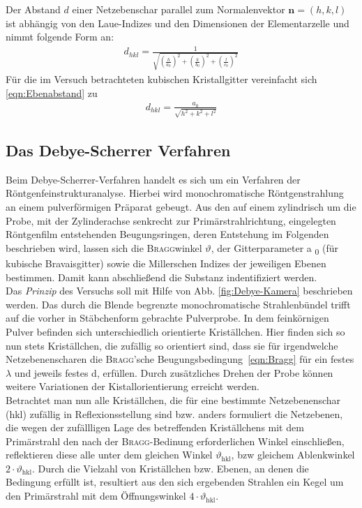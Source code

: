 \documentclass[a4paper,twoside,final]{article}
\begin{document}
Der Abstand $d$ einer Netzebenschar parallel zum Normalenvektor $\bm{n}=(h,k,l)$ ist abhängig von den Laue-Indizes und den Dimensionen der Elementarzelle und nimmt folgende Form an:
\begin{align}
  d_{hkl} = \frac{1}{\sqrt{\left(\frac{h}{a_0}\right)^2+\left(\frac{k}{b_0}\right)^2+\left(\frac{l}{c_0}\right)^2}}\label{eqn:Ebenabstand}
\end{align}
Für die im Versuch betrachteten kubischen Kristallgitter vereinfacht sich \eqref{eqn:Ebenabstand} zu
\begin{align}
  d_{hkl} = \frac{a_0}{\sqrt{h^2+k^2+l^2}}\label{eqn:Abstand_kubisch}
\end{align}

\subsection{Das Debye-Scherrer Verfahren}
Beim Debye-Scherrer-Verfahren handelt es sich um ein Verfahren der Röntgenfeinstrukturanalyse. Hierbei wird monochromatische Röntgenstrahlung an einem pulverförmigen Präparat gebeugt. Aus den auf einem zylindrisch um die Probe, mit der Zylinderachse senkrecht zur Primärstrahlrichtung, eingelegten Röntgenfilm entstehenden Beugungsringen, deren Entstehung im Folgenden beschrieben wird, lassen sich die \textsc{Bragg}winkel $\vartheta$, der Gitterparameter a \textsubscript{0} (für kubische Bravaisgitter) sowie die Millerschen Indizes der jeweiligen Ebenen bestimmen. Damit kann abschließend die Substanz indentifiziert werden.\\
Das \textit{Prinzip} des Versuchs soll mit Hilfe von Abb. \ref{fig:Debye-Kamera} beschrieben werden. Das durch die Blende begrenzte monochromatische Strahlenbündel trifft auf die vorher in Stäbchenform gebrachte Pulverprobe. In dem feinkörnigen Pulver befinden sich unterschiedlich orientierte Kriställchen. Hier finden sich so nun stets Kriställchen, die zufällig so orientiert sind, dass sie für irgendwelche Netzebenenscharen die \textsc{Bragg}'sche Beugungsbedingung~\eqref{eqn:Bragg} für ein festes $\lambda$ und jeweils festes d, erfüllen. Durch zusätzliches Drehen der Probe können weitere Variationen der Kistallorientierung erreicht werden.\\
Betrachtet man nun alle Kriställchen, die für eine bestimmte Netzebenenschar (hkl) zufällig in Reflexionsstellung sind bzw. anders formuliert die Netzebenen, die wegen der zufällligen Lage des betreffenden Kriställchens mit dem Primärstrahl den nach der \textsc{Bragg}-Bedinung erforderlichen Winkel einschließen, reflektieren diese alle unter dem gleichen Winkel $\vartheta_\text{hkl}$, bzw gleichem Ablenkwinkel $2\cdot\vartheta_\text{hkl}$. Durch die Vielzahl von Kriställchen bzw. Ebenen, an denen die Bedingung erfüllt ist, resultiert aus den sich ergebenden Strahlen ein Kegel um den Primärstrahl mit dem Öffnungswinkel $4\cdot\vartheta_\text{hkl}$. \\
\end{document}
